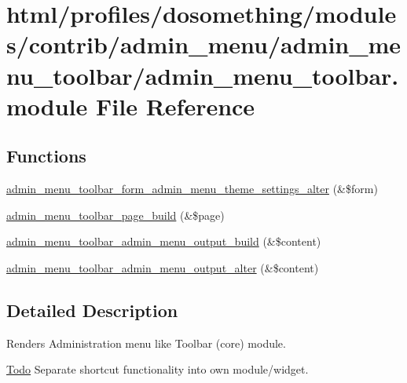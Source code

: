 \hypertarget{admin__menu__toolbar_8module}{
\section{html/profiles/dosomething/modules/contrib/admin\_\-menu/admin\_\-menu\_\-toolbar/admin\_\-menu\_\-toolbar.module File Reference}
\label{admin__menu__toolbar_8module}
}
\subsection*{Functions}
\begin{DoxyCompactItemize}
\item 
\hyperlink{admin__menu__toolbar_8module_aae5cecf58b2e516927281143d392927e}{admin\_\-menu\_\-toolbar\_\-form\_\-admin\_\-menu\_\-theme\_\-settings\_\-alter} (\&\$form)
\item 
\hyperlink{admin__menu__toolbar_8module_a398c1718f88449b886028877688a4864}{admin\_\-menu\_\-toolbar\_\-page\_\-build} (\&\$page)
\item 
\hyperlink{admin__menu__toolbar_8module_adf1db6f09a7fe73cf29064b5f9937c2a}{admin\_\-menu\_\-toolbar\_\-admin\_\-menu\_\-output\_\-build} (\&\$content)
\item 
\hyperlink{admin__menu__toolbar_8module_abf3ffd52da68fc9581db3804043ea693}{admin\_\-menu\_\-toolbar\_\-admin\_\-menu\_\-output\_\-alter} (\&\$content)
\end{DoxyCompactItemize}


\subsection{Detailed Description}
Renders Administration menu like Toolbar (core) module.

\begin{Desc}
\item[\hyperlink{todo__todo000003}{Todo}]Separate shortcut functionality into own module/widget. \end{Desc}


